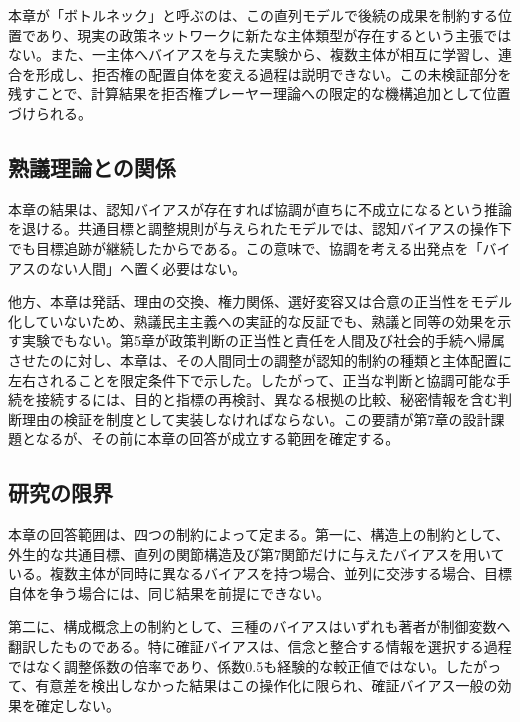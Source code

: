 本章が「ボトルネック」と呼ぶのは、この直列モデルで後続の成果を制約する位置であり、現実の政策ネットワークに新たな主体類型が存在するという主張ではない。また、一主体へバイアスを与えた実験から、複数主体が相互に学習し、連合を形成し、拒否権の配置自体を変える過程は説明できない。この未検証部分を残すことで、計算結果を拒否権プレーヤー理論への限定的な機構追加として位置づけられる。

\subsection{熟議理論との関係}

本章の結果は、認知バイアスが存在すれば協調が直ちに不成立になるという推論を退ける。共通目標と調整規則が与えられたモデルでは、認知バイアスの操作下でも目標追跡が継続したからである。この意味で、協調を考える出発点を「バイアスのない人間」へ置く必要はない。

他方、本章は発話、理由の交換、権力関係、選好変容又は合意の正当性をモデル化していないため、熟議民主主義への実証的な反証でも、熟議と同等の効果を示す実験でもない。第5章が政策判断の正当性と責任を人間及び社会的手続へ帰属させたのに対し、本章は、その人間同士の調整が認知的制約の種類と主体配置に左右されることを限定条件下で示した。したがって、正当な判断と協調可能な手続を接続するには、目的と指標の再検討、異なる根拠の比較、秘密情報を含む判断理由の検証を制度として実装しなければならない。この要請が第7章の設計課題となるが、その前に本章の回答が成立する範囲を確定する。

\subsection{研究の限界}
\label{sec:ch3_limitations}

本章の回答範囲は、四つの制約によって定まる。第一に、構造上の制約として、外生的な共通目標、直列の関節構造及び第7関節だけに与えたバイアスを用いている。複数主体が同時に異なるバイアスを持つ場合、並列に交渉する場合、目標自体を争う場合には、同じ結果を前提にできない。

第二に、構成概念上の制約として、三種のバイアスはいずれも著者が制御変数へ翻訳したものである。特に確証バイアスは、信念と整合する情報を選択する過程ではなく調整係数の倍率であり、係数0.5も経験的な較正値ではない。したがって、有意差を検出しなかった結果はこの操作化に限られ、確証バイアス一般の効果を確定しない。

